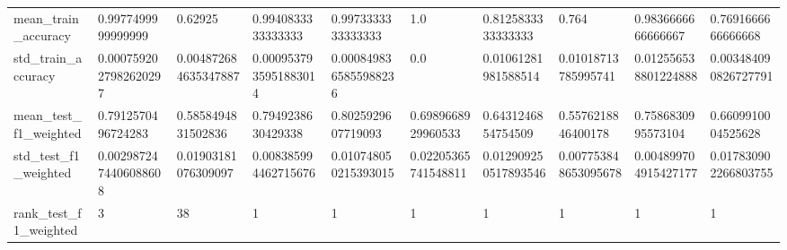 \begin{tabular}{llllllllll}
mean\_train\_accuracy         &                                 0.9977499999999999 &                                            0.62925 &                                 0.9940833333333333 &                                 0.9973333333333333 &                                                1.0 &                                 0.8125833333333333 &                                              0.764 &                                 0.9836666666666667 &                                 0.7691666666666668 \\
std\_train\_accuracy          &                              0.0007592027982620297 &                               0.004872684635347887 &                              0.0009537935951883014 &                              0.0008498365855988236 &                                                0.0 &                                0.01061281981588514 &                                0.01018713785995741 &                               0.012556538801224888 &                               0.003484090826727791 \\
mean\_test\_f1\_weighted       &                                 0.7912570496724283 &                                 0.5858494831502836 &                                 0.7949238630429338 &                                 0.8025929607719093 &                                 0.6989668929960533 &                                 0.6431246854754509 &                                 0.5576218846400178 &                                 0.7586830995573104 &                                 0.6609910004525628 \\
std\_test\_f1\_weighted        &                              0.0029872474406088608 &                                0.01903181076309097 &                               0.008385994462715676 &                               0.010748050215393015 &                                0.02205365741548811 &                               0.012909250517893546 &                               0.007753848653095678 &                               0.004899704915427177 &                               0.017830902266803755 \\
rank\_test\_f1\_weighted       &                                                  3 &                                                 38 &                                                  1 &                                                  1 &                                                  1 &                                                  1 &                                                  1 &                                                  1 &                                                  1 \\

\end{tabular}
